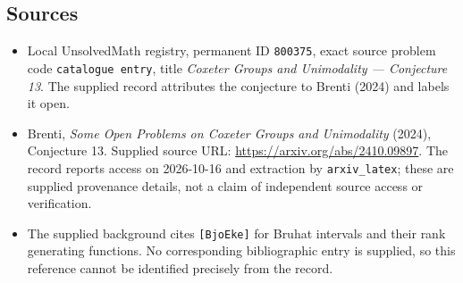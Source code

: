 \documentclass[11pt]{article}
\begin{document}
\subsection{Sources}
\begin{itemize}
\item Local UnsolvedMath registry, permanent ID \texttt{800375}, exact source problem code \texttt{catalogue entry}, title \emph{Coxeter Groups and Unimodality --- Conjecture 13}. The supplied record attributes the conjecture to Brenti (2024) and labels it open.
\item Brenti, \emph{Some Open Problems on Coxeter Groups and Unimodality} (2024), Conjecture 13. Supplied source URL: \url{https://arxiv.org/abs/2410.09897}. The record reports access on 2026-10-16 and extraction by \texttt{arxiv\_latex}; these are supplied provenance details, not a claim of independent source access or verification.
\item The supplied background cites \texttt{[BjoEke]} for Bruhat intervals and their rank generating functions. No corresponding bibliographic entry is supplied, so this reference cannot be identified precisely from the record.
\end{itemize}
\end{document}
